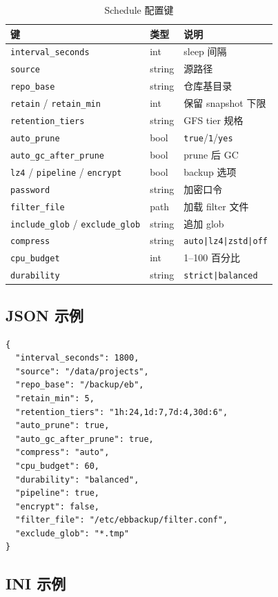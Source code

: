 \begin{table}[htbp]
\centering
\caption{Schedule 配置键}
\small
\begin{tabular}{@{}llp{6cm}@{}}
\toprule
键 & 类型 & 说明 \\
\midrule
\texttt{interval\_seconds} & int &  sleep 间隔 \\
\texttt{source} & string & 源路径 \\
\texttt{repo\_base} & string & 仓库基目录 \\
\texttt{retain} / \texttt{retain\_min} & int & 保留 snapshot 下限 \\
\texttt{retention\_tiers} & string & GFS tier 规格 \\
\texttt{auto\_prune} & bool & \texttt{true}/\texttt{1}/\texttt{yes} \\
\texttt{auto\_gc\_after\_prune} & bool & prune 后 GC \\
\texttt{lz4} / \texttt{pipeline} / \texttt{encrypt} & bool & backup 选项 \\
\texttt{password} & string & 加密口令 \\
\texttt{filter\_file} & path & 加载 filter 文件 \\
\texttt{include\_glob} / \texttt{exclude\_glob} & string & 追加 glob \\
\texttt{compress} & string & \texttt{auto|lz4|zstd|off} \\
\texttt{cpu\_budget} & int & 1--100 百分比 \\
\texttt{durability} & string & \texttt{strict|balanced} \\
\bottomrule
\end{tabular}
\end{table}

\subsection{JSON 示例}

\begin{lstlisting}[caption={schedule.json 示例},label={lst:schedule-json}]
{
  "interval_seconds": 1800,
  "source": "/data/projects",
  "repo_base": "/backup/eb",
  "retain_min": 5,
  "retention_tiers": "1h:24,1d:7,7d:4,30d:6",
  "auto_prune": true,
  "auto_gc_after_prune": true,
  "compress": "auto",
  "cpu_budget": 60,
  "durability": "balanced",
  "pipeline": true,
  "encrypt": false,
  "filter_file": "/etc/ebbackup/filter.conf",
  "exclude_glob": "*.tmp"
}
\end{lstlisting}

\subsection{INI 示例}


